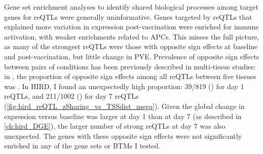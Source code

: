 Gene set enrichment analyses to identify shared biological processes among target genes for \glspl{reQTL} were generally uninformative.
Genes targeted by \glspl{reQTL} that explained more variation in expression post-vaccination were enriched for immune activation, with weaker enrichments related to \glspl{APC}.
This misses the full picture, as many of the strongest \glspl{reQTL} were those with opposite sign effects at baseline and post-vaccination, but little change in \gls{PVE}.
Prevalence of opposite sign effects between pairs of conditions has been previously described in multi-tissue studies:
in \textcite{fu2012UnravelingRegulatoryMechanisms}, the proportion of opposite sign effects among all \glspl{reQTL} between five tissues was .
In \gls{HIRD}, I found an unexpectedly high proportion:
39/819 () for day 1 \glspl{reQTL},
and 211/1002 () for day 7 \glspl{reQTL} (\cref{fig:hird_reQTL_zSharing_vs_TSSdist_mega}).
Given the global change in expression versus baseline was larger at day 1 than at day 7 (as described in \cref{ch:hird_DGE}), 
the larger number of strong \glspl{reQTL} at day 7 was also unexpected.
The genes with these opposite sign effects were not significantly enriched in any of the gene sets or \glspl{BTM} I tested.

